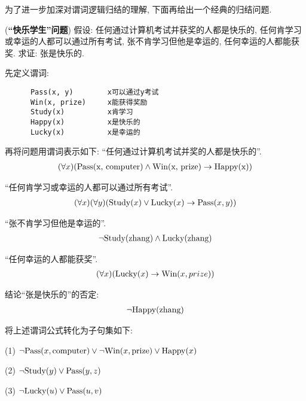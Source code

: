 为了进一步加深对谓词逻辑归结的理解, 下面再给出一个经典的归结问题.
\begin{example}
    (\textbf{“快乐学生”问题}) 假设: 任何通过计算机考试并获奖的人都是快乐的, 任何肯学习或幸运的人都可以通过所有考试, 张不肯学习但他是幸运的, 任何幸运的人都能获奖.
求证: 张是快乐的.
\end{example}
\begin{result}
先定义谓词:
\begin{Verbatim}
      Pass(x, y)        x可以通过y考试
      Win(x, prize)     x能获得奖励
      Study(x)          x肯学习
      Happy(x)          x是快乐的
      Lucky(x)          x是幸运的
\end{Verbatim}

再将问题用谓词表示如下: “任何通过计算机考试并奖的人都是快乐的”.
\begin{align}
  (\forall x)(\textup{Pass(x, computer)}\wedge \textup{Win(x, prize)}\rightarrow \textup{Happy(x)})
\end{align}

“任何肯学习或幸运的人都可以通过所有考试”.
\begin{align}
  (\forall x) (\forall  y) (\textup{Study}(x)\vee \textup{Lucky}(x)\rightarrow \textup{Pass}(x, y))
\end{align}

“张不肯学习但他是幸运的”.
\begin{align}
  \neg \textup{Study}(\textup{zhang})\wedge \textup{Lucky}(\textup{zhang})
\end{align}

“任何幸运的人都能获奖”.
\begin{align}
    (\forall x) (\textup{Lucky}(x)\rightarrow \textup{Win}(x, prize))
\end{align}

结论“张是快乐的”的否定:
\begin{align}
    \neg \textup{Happy}(\textup{zhang})
\end{align}
\end{result}

将上述谓词公式转化为子句集如下:

    (1) $\neg \textup{Pass}(x, \textup{computer})\vee \neg \textup{Win}(x, \textup{prize})\vee \textup{Happy}(x)$

    (2) $\neg \textup{Study}(y)\vee \textup{Pass}(y, z)$

    (3) $\neg \textup{Lucky}(u)\vee \textup{Pass}(u, v)$

